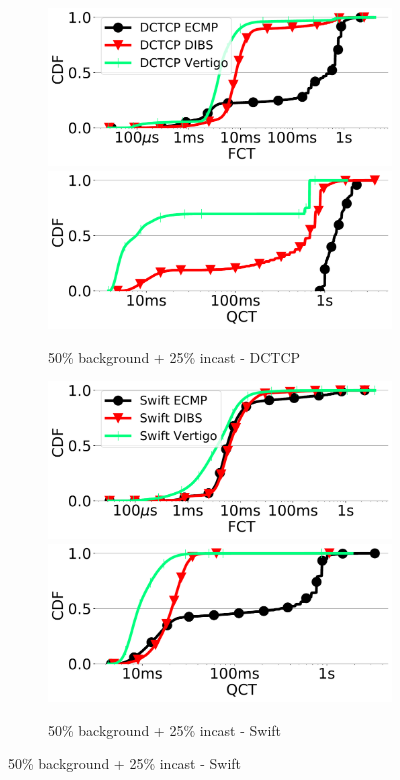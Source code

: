 \begin{figure}[t]
	\begin{subfigure}[t]{.48\linewidth}
	\centering
	\includegraphics[width=0.49\linewidth]{figs/fattree50_25dctcpfctcdf.pdf}
	\includegraphics[width=0.49\linewidth]{figs/fattree50_25dctcpqctcdf.pdf}
		\caption{\small{50\% background + 25\% incast - DCTCP}}
		\label{fig:fattreedc75}
	\end{subfigure}
	\begin{subfigure}[t]{.48\linewidth}
	\centering
	\includegraphics[width=0.49\linewidth]{figs/fattree50_25swiftfctcdf.pdf}
	\includegraphics[width=0.49\linewidth]{figs/fattree50_25swiftqctcdf.pdf}
		\caption{\small{50\% background + 25\% incast - Swift}}
		\label{fig:fattreesw75}
	\end{subfigure}
	

\end{figure}
